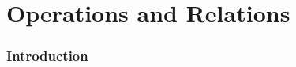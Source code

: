 \documentclass{book}
\begin{document}
   
   
   
   
   
   
   
   
   
   
   
   
   
   
   
   
   
   
   
   
   
   
   
   
   
   
   
   
   
   
   
   
   
   
   
   
   
   
   
   \chapter{Operations and Relations}
   
   \subsection{Introduction}  
   
   
\end{document}
